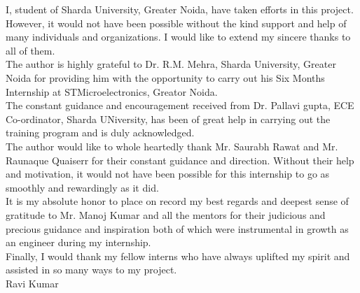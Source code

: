 \begin{Large}
\end{Large}
\noindent I, student of Sharda University, Greater Noida, have taken efforts in this project. However, it would not have been possible without the kind support and help of many individuals and organizations. I would like to extend my sincere thanks to all of them.\\

\noindent The author is highly grateful to Dr. R.M. Mehra, Sharda University, Greater Noida for providing him with the opportunity to carry out his Six Months Internship at STMicroelectronics, Greator Noida.\\

\noindent The constant guidance and encouragement received from Dr. Pallavi gupta, ECE Co-ordinator, Sharda UNiversity, has been of great help in carrying out the training program and is duly acknowledged.\\

\noindent The author would like to whole heartedly thank Mr. Saurabh Rawat and Mr. Raunaque Quaiserr for their constant guidance and direction. Without their help and motivation, it would not have been possible for this internship to go as smoothly and rewardingly as it did.\\

\noindent It is my absolute honor to place on record my best regards and deepest sense of gratitude to Mr. Manoj Kumar and all the mentors for their judicious and precious guidance and inspiration both of which were instrumental in growth as an engineer during my internship.\\

\noindent Finally, I would thank my fellow interns who have always uplifted my spirit and assisted in so many ways to my project.\\

\noindent Ravi Kumar 
